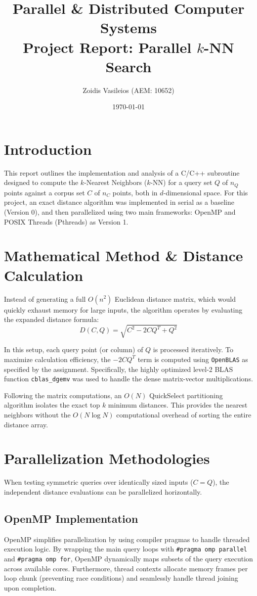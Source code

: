 \documentclass[12pt,a4paper]{article}
\title{Parallel \& Distributed Computer Systems \\ 
\large{Project Report: Parallel $k$-NN Search}}
\author{Zoidis Vasileios (AEM: 10652)}
\date{\today}
\begin{document}
\maketitle

\section{Introduction}
This report outlines the implementation and analysis of a C/C++ subroutine designed to compute the $k$-Nearest Neighbors ($k$-NN) for a query set $Q$ of $n_Q$ points against a corpus set $C$ of $n_C$ points, both in $d$-dimensional space.
For this project, an exact distance algorithm was implemented in serial as a baseline (Version 0), and then parallelized using two main frameworks: OpenMP and POSIX Threads (Pthreads) as Version 1.

\section{Mathematical Method \& Distance Calculation}
Instead of generating a full $O(n^2)$ Euclidean distance matrix, which would quickly exhaust memory for large inputs, the algorithm operates by evaluating the expanded distance formula:
\begin{equation}
D(C, Q) = \sqrt{C^2 - 2 C Q^T + Q^2}
\end{equation}

In this setup, each query point (or column) of $Q$ is processed iteratively. To maximize calculation efficiency, the $-2 C Q^T$ term is computed using \texttt{OpenBLAS} as specified by the assignment. Specifically, the highly optimized level-2 BLAS function \texttt{cblas\_dgemv} was used to handle the dense matrix-vector multiplications.

Following the matrix computations, an $O(N)$ QuickSelect partitioning algorithm isolates the exact top $k$ minimum distances. This provides the nearest neighbors without the $O(N \log N)$ computational overhead of sorting the entire distance array.

\section{Parallelization Methodologies}
When testing symmetric queries over identically sized inputs ($C=Q$), the independent distance evaluations can be parallelized horizontally.

\subsection{OpenMP Implementation}
OpenMP simplifies parallelization by using compiler pragmas to handle threaded execution logic. By wrapping the main query loops with \texttt{\#pragma omp parallel} and \texttt{\#pragma omp for}, OpenMP dynamically maps subsets of the query execution across available cores. Furthermore, thread contexts allocate memory frames per loop chunk (preventing race conditions) and seamlessly handle thread joining upon completion.
\end{document}
